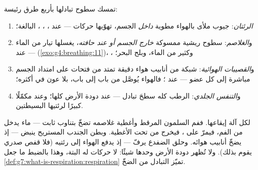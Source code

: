 \begin{definition}\label{def:g7:how-animals-breathe:four}
تمسك  سطوح تبادلها بأربع طرق رئيسة:
\begin{enumerate}
  \item \emph{الرئتان}: جيوب ملأى بالهواء مطوية
        \emph{داخل} الجسم، تهوّيها حركات  --- عند
        ، ، ،  البالغة؛
  \item و\emph{الغلاصم}: سطوح ريشية ممسوكة
        \emph{خارج الجسم أو عند حافته}، يغسلها تيار من الماء ---
        عند 
        (\cref{exo:g4:breathing:11})، ، وكثير من 
        الماء، وبلح البحر؛
  \item و\emph{القصيبات الهوائية}: شبكة من
        أنابيب هواء دقيقة تمتد من فتحات على امتداد الجسم مباشرة
        إلى كل عضو --- عند ؛ فالهواء يُوصَّل من باب إلى
        باب، بلا عون  في أكثره؛
  \item و\emph{التنفس الجلدي}:  الرطب كله
        سطحَ تبادل --- عند دودة الأرض كلها؛ وعند 
        مكمّلًا كبيرًا لرئتيها البسيطتين.
\end{enumerate}
\end{definition}

\begin{example}\label{ex:g7:how-animals-breathe:watch}
لكل آلة إيقاعها. ففم السلمون المرقط وأغطية غلاصمه تضخّ بتناوب ثابت
--- ماء يدخل من الفم، فيمرّ على ، فيخرج من تحت الأغطية.
وبطن الجندب المستريح ينبض --- إذ يضخّ أنابيب هوائه. وحلق الضفدع
يرفّ --- إذ يدفع الهواء إلى رئتيه (فلا قفص صدري يقوم بذلك). ولا
تُظهر دودة الأرض وحدها شيئًا:  لا حركات له البتة،
وهذا بالضبط ما جعل
\cref{def:g7:what-is-respiration:respiration} تميّز التبادل من
الضخّ.
\end{example}

